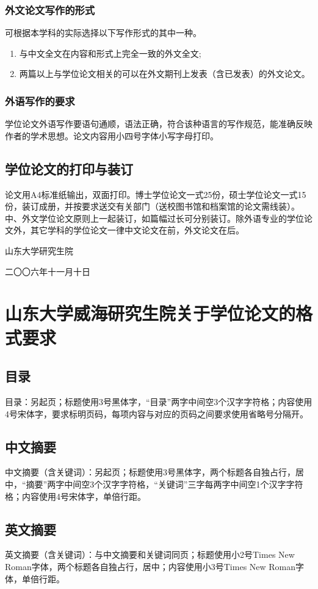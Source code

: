 \documentclass[openany]{sduthesis} %
\begin{document}
\subsubsection{外文论文写作的形式}
可根据本学科的实际选择以下写作形式的其中一种。
\begin{enumerate}
\item 与中文全文在内容和形式上完全一致的外文全文;
\item 两篇以上与学位论文相关的可以在外文期刊上发表（含已发表）的外文论文。
\end{enumerate}
\subsubsection{外语写作的要求}
学位论文外语写作要语句通顺，语法正确，符合该种语言的写作规范，能准确反映作者的学术思想。论文内容用小四号字体小写字母打印。
\subsection{学位论文的打印与装订}
论文用A4标准纸输出，双面打印。博士学位论文一式25份，硕士学位论文一式15份，装订成册，并按要求送交有关部门（送校图书馆和档案馆的论文需线装）。中、外文学位论文原则上一起装订，如篇幅过长可分别装订。除外语专业的学位论文外，其它学科的学位论文一律中文论文在前，外文论文在后。
\vfill
\hfill\begin{minipage}{.3\textwidth}

山东大学研究生院


二〇〇六年十一月十日
\end{minipage}
\section{山东大学威海研究生院关于学位论文的格式要求}
\subsection{目录}
目录：另起页；标题使用3号黑体字，“目录”两字中间空3个汉字字符格；内容使用4号宋体字，要求标明页码，每项内容与对应的页码之间要求使用省略号分隔开。
\subsection{中文摘要}
中文摘要（含关键词）：另起页；标题使用3号黑体字，两个标题各自独占行，居中，“摘要”两字中间空3个汉字字符格，“关键词”三字每两字中间空1个汉字字符格；内容使用4号宋体字，单倍行距。
\subsection{英文摘要}
英文摘要（含关键词）：与中文摘要和关键词同页；标题使用小2号Times New Roman字体，两个标题各自独占行，居中；内容使用小3号Times New Roman字体，单倍行距。
\end{document}

